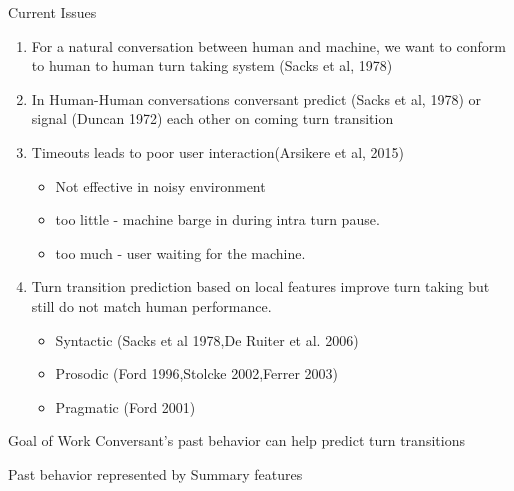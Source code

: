 \begin{frame}{Current Issues}
    \begin{enumerate}[<+->]\itemsep9pt
      \item For a natural conversation between human and machine, we want to conform
            to human to human turn taking system (Sacks et al, 1978)
      \item In Human-Human conversations conversant predict (Sacks et al, 1978) or
            signal (Duncan 1972) each other on coming turn transition
      \item {
        Timeouts leads to poor user interaction(Arsikere et al, 2015)
        \begin{itemize}
            \item Not effective in noisy environment
            \item too little - machine barge in during intra turn pause.
            \item too much - user waiting for the machine.
        \end{itemize}
      }
      \item {
        Turn transition prediction based on local features improve turn taking but still
        do not match human performance.
        \begin{itemize}
            \item Syntactic (Sacks et al 1978,De Ruiter et al. 2006)
            \item Prosodic (Ford 1996,Stolcke 2002,Ferrer 2003)
            \item Pragmatic (Ford 2001)
        \end{itemize}
      }
    \end{enumerate}
\end{frame}

\begin{frame} {Goal of Work}
        Conversant's past behavior can help predict turn transitions

        Past behavior represented by Summary features
\end{frame}
